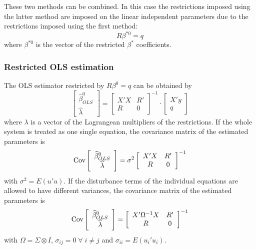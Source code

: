These two methods can be combined.
In this case the restrictions imposed using the latter method are
imposed on the linear independent parameters due to the restrictions
imposed using the first method:
\begin{equation}
   R \beta^{*0} = q
\end{equation}
where $\beta^{*0}$ is the vector of the restricted $\beta^*$ coefficients.

\subsubsection{Restricted OLS estimation}

The OLS estimator restricted by $R \beta^0 = q$ can be obtained by
\begin{equation}
   \left[ \begin{array}{c}
      \widehat{\beta}^0_{OLS} \\ \widehat{\lambda}
   \end{array} \right]
   =
   \left[ \begin{array}{cc}
      X' X & R' \\ 
      R & 0
   \end{array} \right]^{-1}
   \cdot
   \left[ \begin{array}{c}
      X' y \\ q 
   \end{array} \right]
\end{equation}
where $\lambda$ is a vector of the Lagrangean multipliers of the restrictions.
If the whole system is treated as one single equation,
the covariance matrix of the estimated parameters is
\begin{equation}
   \text{Cov} 
   \left[ \begin{array}{c}
      \widehat{\beta}^0_{OLS} \\ \widehat{\lambda}
   \end{array} \right] 
   = \sigma^2 
   \left[ \begin{array}{cc}
      X' X & R' \\ 
      R & 0
   \end{array} \right]^{-1}
\end{equation}
with $\sigma^2 = E \left( u' u \right)$.
If the disturbance terms of the individual equations
are allowed to have different variances, 
the covariance matrix of the estimated parameters is
\begin{equation}
   \text{Cov} 
   \left[ \begin{array}{c}
      \widehat{\beta}^0_{OLS} \\ \widehat{\lambda}
   \end{array} \right] 
   = 
   \left[ \begin{array}{cc}
      X' \Omega^{-1} X & R' \\ 
      R & 0
   \end{array} \right]^{-1}
\end{equation}
with $\Omega = \Sigma \otimes I$, 
$\sigma_{ij} = 0 \; \forall \; i \neq j$ and
$\sigma_{ii} = E \left( u_i' u_i \right)$.


